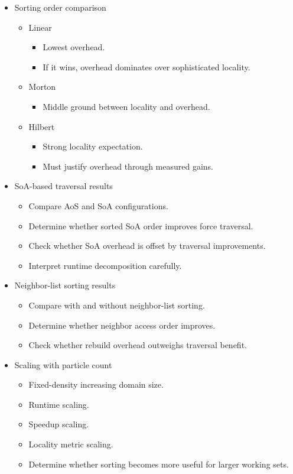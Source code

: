 \begin{itemize}
    \item Sorting order comparison
    \begin{itemize}
        \item Linear
        \begin{itemize}
            \item Lowest overhead.
            \item If it wins, overhead dominates over sophisticated locality.
        \end{itemize}
        \item Morton
        \begin{itemize}
            \item Middle ground between locality and overhead.
        \end{itemize}
        \item Hilbert
        \begin{itemize}
            \item Strong locality expectation.
            \item Must justify overhead through measured gains.
        \end{itemize}
    \end{itemize}

    \item SoA-based traversal results
    \begin{itemize}
        \item Compare AoS and SoA configurations.
        \item Determine whether sorted SoA order improves force traversal.
        \item Check whether SoA overhead is offset by traversal improvements.
        \item Interpret runtime decomposition carefully.
    \end{itemize}

    \item Neighbor-list sorting results
    \begin{itemize}
        \item Compare with and without neighbor-list sorting.
        \item Determine whether neighbor access order improves.
        \item Check whether rebuild overhead outweighs traversal benefit.
    \end{itemize}

    \item Scaling with particle count
    \begin{itemize}
        \item Fixed-density increasing domain size.
        \item Runtime scaling.
        \item Speedup scaling.
        \item Locality metric scaling.
        \item Determine whether sorting becomes more useful for larger working sets.
    \end{itemize}


\end{itemize}
